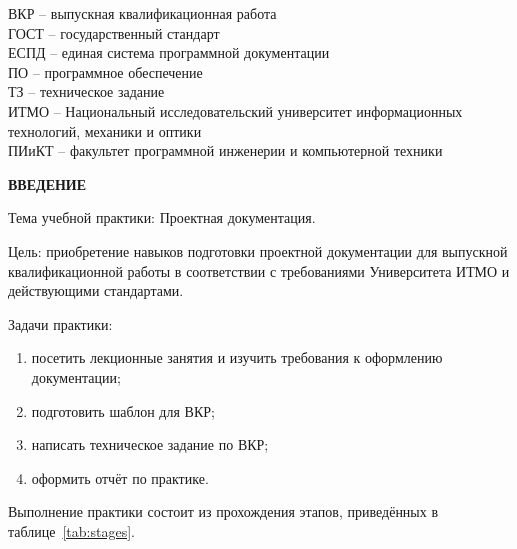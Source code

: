 \documentclass[a4paper,14pt]{extarticle}
\begin{document}
\noindent
ВКР -- выпускная квалификационная работа\\
ГОСТ -- государственный стандарт\\
ЕСПД -- единая система программной документации\\
ПО -- программное обеспечение\\
ТЗ -- техническое задание\\
ИТМО -- Национальный исследовательский университет информационных технологий, механики и оптики\\
ПИиКТ -- факультет программной инженерии и компьютерной техники

\newpage

\begin{center}
\textbf{ВВЕДЕНИЕ}
\end{center}

Тема учебной практики: Проектная документация.

Цель: приобретение навыков подготовки проектной документации для выпускной квалификационной работы в соответствии с требованиями Университета ИТМО и действующими стандартами.

Задачи практики:
\begin{enumerate}
  \item посетить лекционные занятия и изучить требования к оформлению документации;
  \item подготовить шаблон для ВКР;
  \item написать техническое задание по ВКР;
  \item оформить отчёт по практике.
\end{enumerate}

Выполнение практики состоит из прохождения этапов, приведённых в таблице~\ref{tab:stages}.
\end{document}
